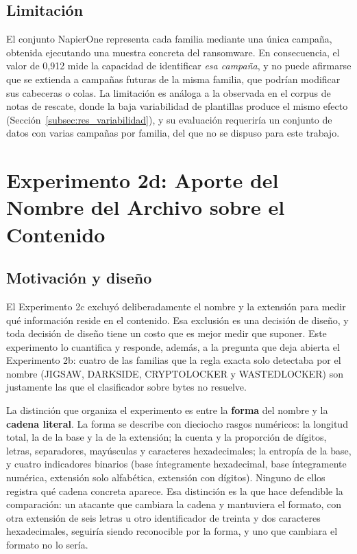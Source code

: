 \subsection{Limitación}
\label{subsec:exp2c_limitacion}

El conjunto NapierOne representa cada familia mediante una única campaña, obtenida ejecutando una muestra concreta del ransomware. En consecuencia, el valor de 0,912 mide la capacidad de identificar \textit{esa campaña}, y no puede afirmarse que se extienda a campañas futuras de la misma familia, que podrían modificar sus cabeceras o colas. La limitación es análoga a la observada en el corpus de notas de rescate, donde la baja variabilidad de plantillas produce el mismo efecto (Sección~\ref{subsec:res_variabilidad}), y su evaluación requeriría un conjunto de datos con varias campañas por familia, del que no se dispuso para este trabajo.

\section{Experimento 2d: Aporte del Nombre del Archivo sobre el Contenido}
\label{sec:exp2d}

\subsection{Motivación y diseño}

El Experimento 2c excluyó deliberadamente el nombre y la extensión para medir qué información reside en el contenido. Esa exclusión es una decisión de diseño, y toda decisión de diseño tiene un costo que es mejor medir que suponer. Este experimento lo cuantifica y responde, además, a la pregunta que deja abierta el Experimento 2b: cuatro de las familias que la regla exacta solo detectaba por el nombre (JIGSAW, DARKSIDE, CRYPTOLOCKER y WASTEDLOCKER) son justamente las que el clasificador sobre bytes no resuelve.

La distinción que organiza el experimento es entre la \textbf{forma} del nombre y la \textbf{cadena literal}. La forma se describe con dieciocho rasgos numéricos: la longitud total, la de la base y la de la extensión; la cuenta y la proporción de dígitos, letras, separadores, mayúsculas y caracteres hexadecimales; la entropía de la base, y cuatro indicadores binarios (base íntegramente hexadecimal, base íntegramente numérica, extensión solo alfabética, extensión con dígitos). Ninguno de ellos registra qué cadena concreta aparece. Esa distinción es la que hace defendible la comparación: un atacante que cambiara la cadena y mantuviera el formato, con otra extensión de seis letras u otro identificador de treinta y dos caracteres hexadecimales, seguiría siendo reconocible por la forma, y uno que cambiara el formato no lo sería.

